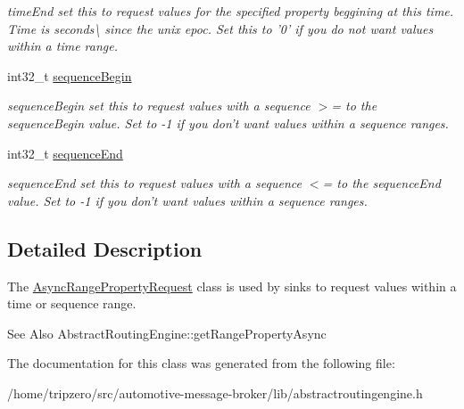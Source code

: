 \begin{DoxyCompactItemize}
\begin{DoxyCompactList}\small\item\em time\-End set this to request values for the specified property beggining at this time. Time is seconds\textbackslash{} since the unix epoc. Set this to '0' if you do not want values within a time range. \end{DoxyCompactList}\item 
\hypertarget{classAsyncRangePropertyRequest_a024dab8e12c45ea8988b7f3e4b3c85c0}{int32\-\_\-t \hyperlink{classAsyncRangePropertyRequest_a024dab8e12c45ea8988b7f3e4b3c85c0}{sequence\-Begin}}\label{classAsyncRangePropertyRequest_a024dab8e12c45ea8988b7f3e4b3c85c0}

\begin{DoxyCompactList}\small\item\em sequence\-Begin set this to request values with a sequence $>$= to the sequence\-Begin value. Set to -\/1 if you don't want values within a sequence ranges. \end{DoxyCompactList}\item 
\hypertarget{classAsyncRangePropertyRequest_a352afdecef1d1e6fc1f82384d0c9edfe}{int32\-\_\-t \hyperlink{classAsyncRangePropertyRequest_a352afdecef1d1e6fc1f82384d0c9edfe}{sequence\-End}}\label{classAsyncRangePropertyRequest_a352afdecef1d1e6fc1f82384d0c9edfe}

\begin{DoxyCompactList}\small\item\em sequence\-End set this to request values with a sequence $<$= to the sequence\-End value. Set to -\/1 if you don't want values within a sequence ranges. \end{DoxyCompactList}\end{DoxyCompactItemize}


\subsection{Detailed Description}
The \hyperlink{classAsyncRangePropertyRequest}{Async\-Range\-Property\-Request} class is used by sinks to request values within a time or sequence range. 

\begin{DoxySeeAlso}{See Also}
Abstract\-Routing\-Engine\-::get\-Range\-Property\-Async 
\end{DoxySeeAlso}


The documentation for this class was generated from the following file\-:\begin{DoxyCompactItemize}
\item 
/home/tripzero/src/automotive-\/message-\/broker/lib/abstractroutingengine.\-h\end{DoxyCompactItemize}
